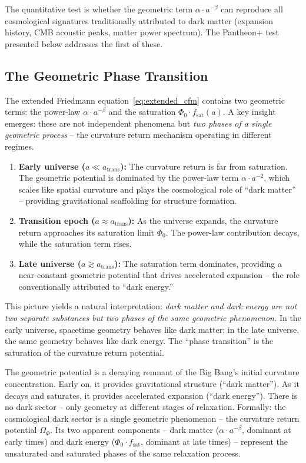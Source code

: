 \documentclass[aps,prd,twocolumn,superscriptaddress,nofootinbib,floatfix]{revtex4-2}
\begin{document}
The quantitative test is whether the geometric term $\alpha \cdot a^{-\beta}$ can reproduce all cosmological signatures traditionally attributed to dark matter (expansion history, CMB acoustic peaks, matter power spectrum). The Pantheon+ test presented below addresses the first of these.

\subsection{The Geometric Phase Transition}
\label{subsec:phase_transition}

The extended Friedmann equation~\eqref{eq:extended_cfm} contains two geometric terms: the power-law $\alpha \cdot a^{-\beta}$ and the saturation $\Phi_0 \cdot f_{\mathrm{sat}}(a)$. A key insight emerges: these are not independent phenomena but \textit{two phases of a single geometric process} -- the curvature return mechanism operating in different regimes.

\begin{enumerate}
\item \textbf{Early universe ($a \ll a_{\mathrm{trans}}$):} The curvature return is far from saturation. The geometric potential is dominated by the power-law term $\alpha \cdot a^{-2}$, which scales like spatial curvature and plays the cosmological role of ``dark matter'' -- providing gravitational scaffolding for structure formation.

\item \textbf{Transition epoch ($a \approx a_{\mathrm{trans}}$):} As the universe expands, the curvature return approaches its saturation limit $\Phi_0$. The power-law contribution decays, while the saturation term rises.

\item \textbf{Late universe ($a \gtrsim a_{\mathrm{trans}}$):} The saturation term dominates, providing a near-constant geometric potential that drives accelerated expansion -- the role conventionally attributed to ``dark energy.''
\end{enumerate}

This picture yields a natural interpretation: \textit{dark matter and dark energy are not two separate substances but two phases of the same geometric phenomenon.} In the early universe, spacetime geometry behaves like dark matter; in the late universe, the same geometry behaves like dark energy. The ``phase transition'' is the saturation of the curvature return potential.

The geometric potential is a decaying remnant of the Big Bang's initial curvature concentration. Early on, it provides gravitational structure (``dark matter''). As it decays and saturates, it provides accelerated expansion (``dark energy''). There is no dark sector -- only geometry at different stages of relaxation. Formally: the cosmological dark sector is a single geometric phenomenon -- the curvature return potential $\Omega_\Phi$. Its two apparent components -- dark matter ($\alpha \cdot a^{-\beta}$, dominant at early times) and dark energy ($\Phi_0 \cdot f_{\mathrm{sat}}$, dominant at late times) -- represent the unsaturated and saturated phases of the same relaxation process.
\end{document}
